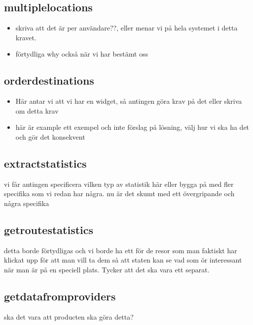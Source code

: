 \documentclass[a4paper]{article}
\begin{document}
	\subsection{multiplelocations}
		\begin{itemize}
			\item skriva att det är per användare??, eller menar vi på hela systemet i detta kravet. 
			\item förtydliga why också när vi har bestämt oss
		\end{itemize}
		
		
	\subsection{orderdestinations}
		\begin{itemize}
			\item Här antar vi att vi har en widget, så antingen göra krav på det eller skriva om detta krav
			\item här är example ett exempel och inte förslag på lösning, välj hur vi ska ha det och gör det konsekvent
 		
		\end{itemize}
		
	\subsection{extractstatistics}
vi får antingen specificera vilken typ av statistik  här eller bygga på med  fler specifika som vi redan har några. nu är det skumt med ett övergripande och några specifika
		
	\subsection{getroutestatistics}
	detta borde förtydligas och vi borde ha ett för de resor som man faktiskt har klickat upp för att man vill ta dem så att staten kan se vad som ör interessant när man är på en speciell plats. Tycker att det ska vara ett separat.
	
	\subsection{getdatafromproviders}
	ska det vara att producten ska göra detta?
	
\end{document}

